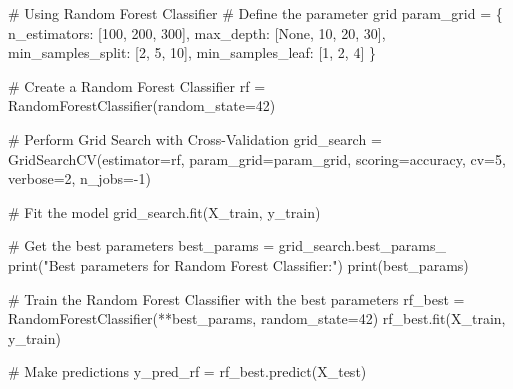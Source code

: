 \documentclass[
  11pt,
  letterpaper,
  DIV=11,
  numbers=noendperiod]{scrartcl}
\newenvironment{Shaded}{\begin{snugshade}}{\end{snugshade}}
\newcommand{\BuiltInTok}[1]{\textcolor[rgb]{0.00,0.23,0.31}{#1}}
\newcommand{\CommentTok}[1]{\textcolor[rgb]{0.37,0.37,0.37}{#1}}
\newcommand{\DecValTok}[1]{\textcolor[rgb]{0.68,0.00,0.00}{#1}}
\newcommand{\NormalTok}[1]{\textcolor[rgb]{0.00,0.23,0.31}{#1}}
\newcommand{\OperatorTok}[1]{\textcolor[rgb]{0.37,0.37,0.37}{#1}}
\newcommand{\StringTok}[1]{\textcolor[rgb]{0.13,0.47,0.30}{#1}}
\newcommand{\VariableTok}[1]{\textcolor[rgb]{0.07,0.07,0.07}{#1}}
\begin{document}
\begin{Shaded}
\begin{Highlighting}[]
\CommentTok{\# Using Random Forest Classifier}
\CommentTok{\# Define the parameter grid}
\NormalTok{param\_grid }\OperatorTok{=}\NormalTok{ \{}
    \StringTok{\textquotesingle{}n\_estimators\textquotesingle{}}\NormalTok{: [}\DecValTok{100}\NormalTok{, }\DecValTok{200}\NormalTok{, }\DecValTok{300}\NormalTok{],}
    \StringTok{\textquotesingle{}max\_depth\textquotesingle{}}\NormalTok{: [}\VariableTok{None}\NormalTok{, }\DecValTok{10}\NormalTok{, }\DecValTok{20}\NormalTok{, }\DecValTok{30}\NormalTok{],}
    \StringTok{\textquotesingle{}min\_samples\_split\textquotesingle{}}\NormalTok{: [}\DecValTok{2}\NormalTok{, }\DecValTok{5}\NormalTok{, }\DecValTok{10}\NormalTok{],}
    \StringTok{\textquotesingle{}min\_samples\_leaf\textquotesingle{}}\NormalTok{: [}\DecValTok{1}\NormalTok{, }\DecValTok{2}\NormalTok{, }\DecValTok{4}\NormalTok{]}
\NormalTok{\}}

\CommentTok{\# Create a Random Forest Classifier}
\NormalTok{rf }\OperatorTok{=}\NormalTok{ RandomForestClassifier(random\_state}\OperatorTok{=}\DecValTok{42}\NormalTok{)}

\CommentTok{\# Perform Grid Search with Cross{-}Validation}
\NormalTok{grid\_search }\OperatorTok{=}\NormalTok{ GridSearchCV(estimator}\OperatorTok{=}\NormalTok{rf, param\_grid}\OperatorTok{=}\NormalTok{param\_grid,}
\NormalTok{                           scoring}\OperatorTok{=}\StringTok{\textquotesingle{}accuracy\textquotesingle{}}\NormalTok{, cv}\OperatorTok{=}\DecValTok{5}\NormalTok{, verbose}\OperatorTok{=}\DecValTok{2}\NormalTok{, n\_jobs}\OperatorTok{={-}}\DecValTok{1}\NormalTok{)}

\CommentTok{\# Fit the model}
\NormalTok{grid\_search.fit(X\_train, y\_train)}

\CommentTok{\# Get the best parameters}
\NormalTok{best\_params }\OperatorTok{=}\NormalTok{ grid\_search.best\_params\_}
\BuiltInTok{print}\NormalTok{(}\StringTok{"Best parameters for Random Forest Classifier:"}\NormalTok{)}
\BuiltInTok{print}\NormalTok{(best\_params)}

\CommentTok{\# Train the Random Forest Classifier with the best parameters}
\NormalTok{rf\_best }\OperatorTok{=}\NormalTok{ RandomForestClassifier(}\OperatorTok{**}\NormalTok{best\_params, random\_state}\OperatorTok{=}\DecValTok{42}\NormalTok{)}
\NormalTok{rf\_best.fit(X\_train, y\_train)}

\CommentTok{\# Make predictions}
\NormalTok{y\_pred\_rf }\OperatorTok{=}\NormalTok{ rf\_best.predict(X\_test)}


\end{Highlighting}
\end{Shaded}
\end{document}
